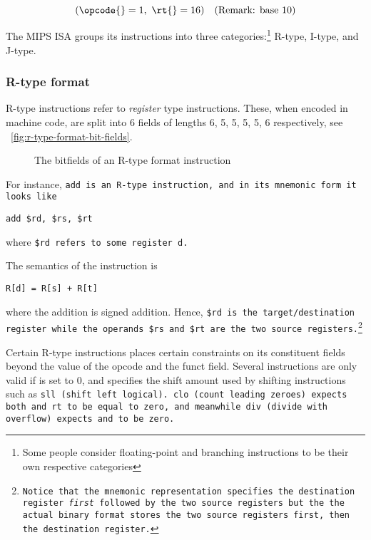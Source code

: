 \begin{equation*}
(\opcode{}=1,\ \rt{}=16) \textrm{\hspace{1em}(Remark: base 10)}
\end{equation*}

The MIPS ISA groups its instructions into three
categories:\footnote{Some people consider floating-point and branching
  instructions to be their own respective categories} R-type, I-type, and J-type.

\subsubsection{R-type format}

R-type instructions refer to \emph{register} type instructions. These,
when encoded in machine code, are split into 6 fields of lengths 6, 5,
5, 5, 5, 6 respectively, see ~\autoref{fig:r-type-format-bit-fields}.

\begin{figure}[H]
  \makebox[\textwidth][c]{
  } 
  \caption{The bitfields of an R-type format instruction}
  \label{fig:r-type-format-bit-fields}
\end{figure}

For instance, \tt{add} is an R-type instruction, and in
its mnemonic form it looks like

\begin{lstlisting}[style=mips_lst]
add $rd, $rs, $rt
\end{lstlisting}

where \tt{\$rd} refers to some register \tt{d}.

The semantics of the instruction is

\begin{lstlisting}[style=semantics_lst]
R[d] = R[s] + R[t]
\end{lstlisting}

where the addition is signed addition. Hence, \tt{\$rd} is the
target/destination register while the operands \tt{\$rs} and
\tt{\$rt} are the two source registers.\footnote{Notice that the
  mnemonic representation specifies the destination register
  \emph{first} followed by the two source registers but the the actual
  binary format stores the two source registers first, then the
  destination register.}

Certain R-type instructions places certain constraints on its
constituent fields beyond the value of the opcode and the funct
field. Several instructions are only valid if \shamt{} is set to
0, and specifies the shift amount used by shifting instructions such
as \tt{sll} (shift left logical). \tt{clo} (count leading
zeroes) expects both \shamt{} and \tt{rt} to be equal to
zero, and meanwhile \tt{div} (divide with overflow) expects
\rd{} and \shamt{} to be zero.

